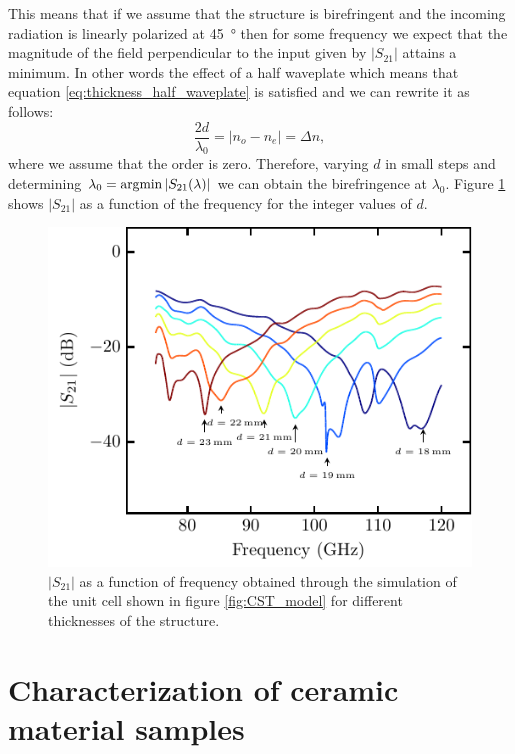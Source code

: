 This means that if we assume that the structure is birefringent and the incoming radiation is linearly polarized at \SI{45}{\degree} then for some frequency we expect that the magnitude of the field perpendicular to the input given by $|S_{21}|$ attains a minimum. In other words the effect of a half waveplate which means that equation \ref{eq:thickness_half_waveplate} is satisfied and we can rewrite it as follows:
\begin{equation}
    \frac{2d}{\lambda_0}=|n_o-n_e|=\Delta n,
\end{equation}
where we assume that the order is zero. Therefore, varying $d$ in small steps and determining $\lambda_0=\operatorname*{\arg\!\min}|S_{21}(\lambda)|$ we can obtain the birefringence at $\lambda_0$. Figure \ref{fig:bf_sim} shows $|S_{21}|$ as a function of the frequency for the integer values of $d$.

\begin{figure}[H]
    \centering
    \includegraphics[scale=1]{images/7_appendix/plots/cst_sim/bf_sim.pdf}
    \caption{$|S_{21}|$ as a function of frequency obtained through the simulation of the unit cell shown in figure \ref{fig:CST_model} for different thicknesses of the structure.}
    \label{fig:bf_sim}
\end{figure}

\chapter{Characterization of ceramic material samples}
\label{sec:ceramic_characterization}
